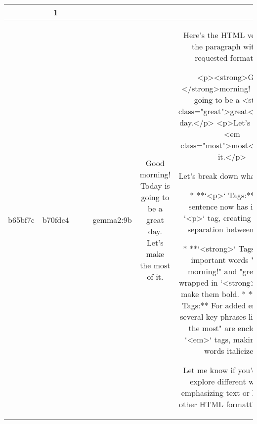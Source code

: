 \begin{table}[h!]
\begin{tabular}{|c|c|c|c|c|c|c|c|c|c|}
{{However, the description specifies that the paragraph should be split into individual sentences, and each sentence should be wrapped in a `<p>` tag. The output shows repetition of content from two distinct `<p>` entries. This suggests that there are only two unique sentences present, and content has been duplicated to create additional `<p>` tags without actually having distinct sentences.

Thus, there is a violation since the requirement of breaking the original paragraph into individual sentences and formatting each as a `<p>` tag is not met because the output shows duplication instead of distinct sentences.

ERR & 1\\
\hline
b65bf7c & b70fdc4 &  &  & gemma2:9b & Good morning! Today is going to be a great day. Let's make the most of it. & Here's the HTML version of the paragraph with the requested formatting:

<p><strong>Good </strong>morning!  Today is going to be a <strong class="great">great</strong> day.</p>
<p>Let's make the <em class="most">most</em> of it.</p>



Let's break down what we did:


* **`<p>` Tags:** Each sentence now has its own `<p>` tag, creating a visual separation between them.

* **`<strong>` Tags:** The important words "Good morning!" and "great" are wrapped in `<strong>` tags to make them bold.
* **`<em>` Tags:** For added emphasis, several key phrases like "make the most" are enclosed in `<em>` tags, making those words italicized.



Let me know if you'd like to explore different ways of emphasizing text or have any other HTML formatting tasks! & err & The evaluation of the chatbot output reveals that it does not comply with the description provided. The description requires that the output must have at least three `<p>` tags, with each sentence wrapped in its own `<p>` tag. However, the chatbot output contains only two `<p>` tags:

1. `<p><strong>Good </strong>morning! Today is going to be a <strong class="great">great</strong> day.</p>`
2. `<p>Let's make the <em class="most">most</em> of it.</p>`

Additionally, the second sentence "Let's make the most of it." is directly followed by the breakdown explanation, which should also be wrapped in a `<p>` tag as per the requirements.

}}
\end{tabular}
\end{table}
